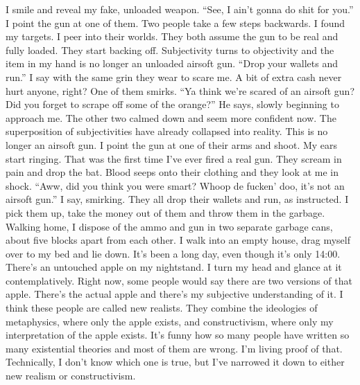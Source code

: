 \documentclass[a4paper, 12pt]{book}
\begin{document}
\newline
\tab
I smile and reveal my fake, unloaded weapon. ``See, I ain’t gonna do shit for you.'' I point the gun at one of them. Two people take a few steps backwards. I found my targets. I peer into their worlds. They both assume the gun to be real and fully loaded. They start backing off. Subjectivity turns to objectivity and the item in my hand is no longer an unloaded airsoft gun. ``Drop your wallets and run.'' I say with the same grin they wear to scare me. A bit of extra cash never hurt anyone, right?
\newline
\tab
One of them smirks. ``Ya think we’re scared of an airsoft gun? Did you forget to scrape off some of the orange?'' He says, slowly beginning to approach me. The other two calmed down and seem more confident now. The superposition of subjectivities have already collapsed into reality. This is no longer an airsoft gun. I point the gun at one of their arms and shoot. My ears start ringing. That was the first time I’ve ever fired a real gun.
\newline
\tab
They scream in pain and drop the bat. Blood seeps onto their clothing and they look at me in shock. ``Aww, did you think you were smart? Whoop de fucken’ doo, it’s not an airsoft gun.'' I say, smirking. They all drop their wallets and run, as instructed. I pick them up, take the money out of them and throw them in the garbage. Walking home, I dispose of the ammo and gun in two separate garbage cans, about five blocks apart from each other.
\newline
\tab
I walk into an empty house, drag myself over to my bed and lie down. It’s been a long day, even though it’s only 14:00. There’s an untouched apple on my nightstand. I turn my head and glance at it contemplatively. Right now, some people would say there are two versions of that apple. There’s the actual apple and there’s my subjective understanding of it. I think these people are called new realists. They combine the ideologies of metaphysics, where only the apple exists, and constructivism, where only my interpretation of the apple exists. It’s funny how so many people have written so many existential theories and most of them are wrong. I’m living proof of that. Technically, I don’t know which one is true, but I’ve narrowed it down to either new realism or constructivism.
\newline
\tab
\end{document}
